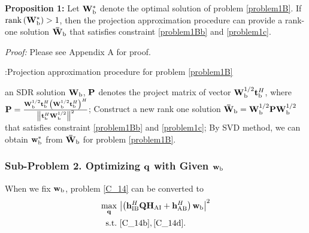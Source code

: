 \documentclass[10pt,journal,letterpaper,twocolumn,twoside]{IEEEtran} %
\begin{document}
{\bf {Proposition 1:}} Let ${\bf{W}}_{{\rm{b}}}^*$ denote the optimal solution of
problem \eqref{problem1B}. If ${\rm{rank}}\left( {{\bf{W}}_{{\rm{b}}}^*} \right) > 1$, then the projection approximation
procedure can provide a rank-one solution ${{{\bf{\bar W}}}_{\rm{b}}}$ that satisfies constraint  \eqref{problem1Bb} and  \eqref{problem1c}.

\emph{ Proof:} Please see Appendix A for proof.


\begin{algorithm}[htb]
\caption{  :Projection approximation procedure for problem \eqref{problem1B} }
  \begin{algorithmic}[1]
     an SDR solution ${\bf{W}}_{\rm{b}}$, ${\bf{P}}$ denotes the project matrix of vector ${{\bf{W}}_{\rm{b}}^{{1 \mathord{\left/
 {\vphantom {1 2}} \right.
 \kern-\nulldelimiterspace} 2}}{\bf{t}}_{\rm{b}}^H}$, where
    ${\bf{P}} = \frac{{{\bf{W}}_{\rm{b}}^{{1 \mathord{\left/
 {\vphantom {1 2}} \right.
 \kern-\nulldelimiterspace} 2}}{\bf{t}}_{\rm{b}}^H{{\left( {{\bf{W}}_{\rm{b}}^{{1 \mathord{\left/
 {\vphantom {1 2}} \right.
 \kern-\nulldelimiterspace} 2}}{\bf{t}}_{\rm{b}}^H} \right)}^H}}}{{{{\left\| {{\bf{t}}_{\rm{b}}^H{\bf{W}}_{\rm{b}}^{{1 \mathord{\left/
 {\vphantom {1 2}} \right.
 \kern-\nulldelimiterspace} 2}}} \right\|}^2}}}$;
    \State  Construct a new rank one solution ${{{\bf{\bar W}}}_{\rm{b}}} = {\bf{W}}_{\rm{b}}^{{1 \mathord{\left/
 {\vphantom {1 2}} \right.
 \kern-\nulldelimiterspace} 2}}{\bf{PW}}_{\rm{b}}^{{1 \mathord{\left/
 {\vphantom {1 2}} \right.
 \kern-\nulldelimiterspace} 2}}$ that satisfies constraint  \eqref{problem1Bb} and  \eqref{problem1c};
    \State By SVD method, we can obtain ${{{\bf{w}}_{\rm{b}} ^ *}} $ from ${{{\bf{\bar W}}}_{\rm{b}}}$ for problem  \eqref{problem1B}.
  \end{algorithmic}
\end{algorithm}




  \subsubsection{{{Sub-Problem 2. Optimizing ${\bf{q}}$ with Given ${{\mathbf{w}}_{\rm{b}}}$}}}
When we fix ${{\mathbf{w}}_{\rm{b}}}$, problem \eqref{C_14} can be converted to
\begin{align}\label{C_15}
 \mathop {\max }\limits_{{\bf{q}}} ~&{{{{\left| {\left( {{\bf{h}}_{{\rm{IB}}}^H{\bf{Q}}{{\bf{H}}_{{\rm{AI}}}} + {\bf{h}}_{{\rm{AB}}}^H} \right){{\bf{w}}_{\rm{b}}}} \right|}^2}}} \\
 {\rm{s.t.}}~&\eqref{C_14b},\eqref{C_14d}\notag.
 \end{align}
\end{document}

